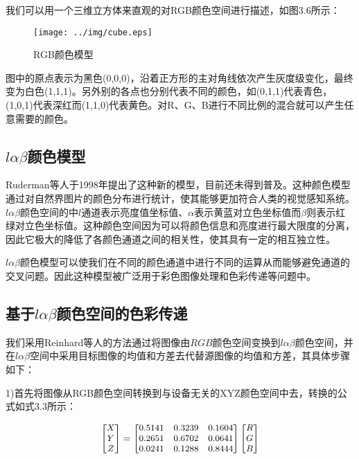 我们可以用一个三维立方体来直观的对RGB颜色空间进行描述\cite{Gonzalez02}，如图3.6所示：

\begin{figure}[htb]
\centering
\texttt{[image: ../img/cube.eps]}
\caption{RGB颜色模型}
\label{fig：graph}
\end{figure} 
图中的原点表示为黑色(0,0,0)，沿着正方形的主对角线依次产生灰度级变化，最终变为白色(1,1,1)。另外别的各点也分别代表不同的颜色，如(0,1,1)代表青色，(1,0,1)代表深红而(1,1,0)代表黄色。对R、G、B进行不同比例的混合就可以产生任意需要的颜色。     

\subsection{$l\alpha\beta$颜色模型}
Ruderman等人\cite{Ruderman98}于1998年提出了这种新的模型，目前还未得到普及。这种颜色模型通过对自然界图片的颜色分布进行统计，使其能够更加符合人类的视觉感知系统。$l\alpha\beta$颜色空间的中$l$通道表示亮度值坐标值、$\alpha$表示黄蓝对立色坐标值而$\beta$则表示红绿对立色坐标值\cite{ZhaoMY08,ZhuoY06}。这种颜色空间因为可以将颜色信息和亮度进行最大限度的分离，因此它极大的降低了各颜色通道之间的相关性，使其具有一定的相互独立性。

$l\alpha\beta$颜色模型可以使我们在不同的颜色通道中进行不同的运算从而能够避免通道的交叉问题。因此这种模型被广泛用于彩色图像处理和色彩传递等问题中。

\subsection{基于$l\alpha\beta$颜色空间的色彩传递}
我们采用Reinhard等人\cite{Reinhard01}的方法通过将图像由$RGB$颜色空间变换到$l\alpha\beta$颜色空间，并在$l\alpha\beta$空间中采用目标图像的均值和方差去代替源图像的均值和方差\cite{LinY01}，其具体步骤如下：

1)首先将图像从RGB颜色空间转换到与设备无关的XYZ颜色空间中去，转换的公式如式3.3所示：

\begin{eqnarray} 
  \begin{small}     %
	\begin{bmatrix}
	  X\\  %
	  Y\\  %
	  Z\\  %
	\end{bmatrix}  
	= 
	\begin{bmatrix}
	  0.5141 & 0.3239 & 0.1604\\
	  0.2651 & 0.6702 & 0.0641\\
	  0.0241 & 0.1288 & 0.8444\\
	\end{bmatrix} 
	\begin{bmatrix}
	  R\\
	  G\\
	  B\\
	\end{bmatrix}
  \end{small}
\end{eqnarray}

